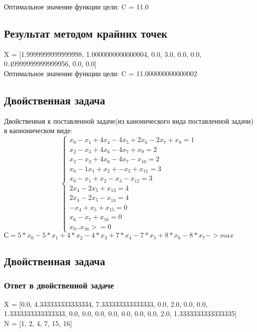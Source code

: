 \documentclass[a4]{article}
\begin{document}
				Оптимальное значение функции цели: C = 11.0
			\subsection{Результат методом крайних точек}
				X = [1.9999999999999998, 1.0000000000000004, 0.0, 3.0, 0.0, 0.0, 0.49999999999999956, 0.0, 0.0]\\
				
				Оптимальное значение функции цели: C = 11.000000000000002
			\subsection{Двойственная задача}
			Двойственная к поставленной задаче(из канонического вида поставленной задачи) в каононическом виде:
			\begin{equation*}
				\begin{cases}
					x_0 -x_1 + 4x_4 - 4x_5 + 2x_6 - 2x_7 + x_8 = 1\\
					x_2 - x_3 + 4x_6 - 4x_7 + x_9 = 2\\
					x_2 -x_3 + 4x_6 - 4x_7 - x_{10} = 2\\
					x_0 -1x_1 + x_2 + -x_3 + x_{11} = 3\\
					x_0 - x_1 + x_2 -x_3 - x_{12} = 3\\
					2x_4 - 2x_5 + x_{13} = 4\\
					2x_4 -2x_5 - x_{14} = 4\\
					-x_4 + x_5 + x_{15} = 0\\
					x_6 -x_7 + x_{16} = 0\\
					x_0.. x_{16} >= 0 
				\end{cases}
			\end{equation*}
			$С = 5*x_0 - 5*x_1 + 4*x_2 - 4*x_3 + 7*x_4 - 7*x_5 + 8*x_6 - 8*x_7->max$
			
			\subsection{Двойственная задача}
				\subsubsection{Ответ в двойственной задаче}
					X = [0.0, 4.333333333333334, 7.333333333333333, 0.0, 2.0, 0.0, 0.0, 1.3333333333333333, 0.0, 0.0, 0.0, 0.0, 0.0, 0.0, 0.0, 2.0, 1.3333333333333335]\\
					
					N = [1, 2, 4, 7, 15, 16]\\
					
\end{document}
